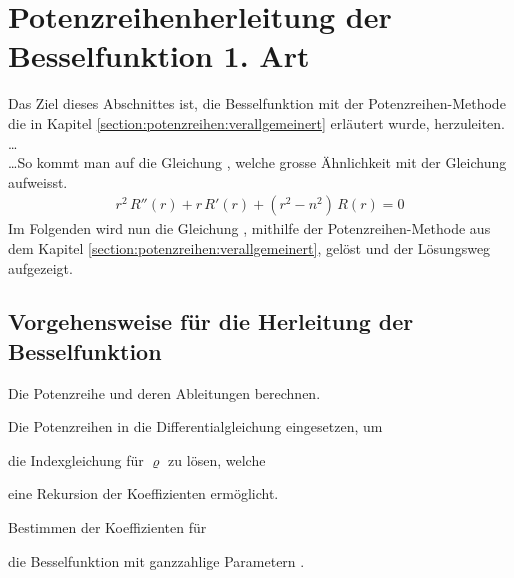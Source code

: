%
%
%
%
%
\section[Potenzreihenherleitung der Besselfunktion]{Potenzreihenherleitung der Besselfunktion 1. Art}
	Das Ziel dieses Abschnittes ist, die Besselfunktion mit der Potenzreihen-Methode die in Kapitel \ref{section:potenzreihen:verallgemeinert} erl\"autert wurde,
	herzuleiten.
\dots \\
%
	\dots So kommt man auf die Gleichung ,
	welche grosse \"Ahnlichkeit mit der Gleichung  aufweisst.
\begin{align}
	r^2 \, R'' \left( r \right)
	+
	r \, R' \left( r \right)
	+
	\left( r^2 - n^2 \right) \, R \left( r \right)
	=
	0
	\label{eq:bessel:dgl}
\end{align}
	Im Folgenden wird nun die Gleichung ,
	mithilfe der Potenzreihen-Methode aus dem Kapitel \ref{section:potenzreihen:verallgemeinert},
	gel\"ost und der L\"osungsweg aufgezeigt.
\subsection[Vorgehensweise]{Vorgehensweise f\"ur die Herleitung der Besselfunktion}
\begin{compactenum}
	\item Die Potenzreihe und deren Ableitungen berechnen.
	\item Die Potenzreihen in die Differentialgleichung  eingesetzen, um
	\item die Indexgleichung f\"ur $\varrho$ zu l\"osen, welche
	\item eine Rekursion der Koeffizienten erm\"oglicht.
	\item Bestimmen der Koeffizienten f\"ur
	\item die Besselfunktion mit ganzzahlige Parametern .
\end{compactenum}


